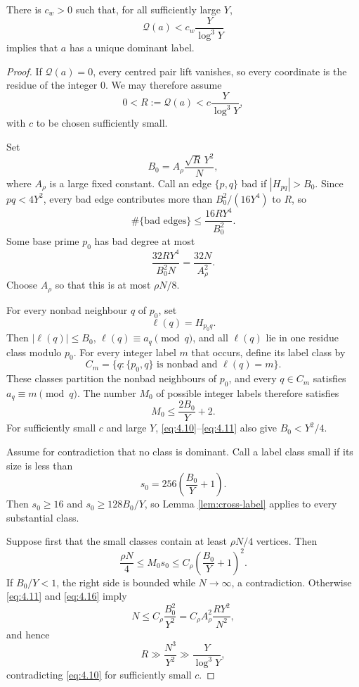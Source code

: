 \begin{proposition}\label{prop:dominant-label}
There is $c_w>0$ such that, for all sufficiently large $Y$,
\[
\mathcal Q(a)<c_w\frac{Y}{\log^3Y}
\tag{4.9}\label{eq:4.9}
\]
implies that $a$ has a unique dominant label.
\end{proposition}

\begin{proof}
If $\mathcal Q(a)=0$, every centred pair lift vanishes, so every coordinate is the residue of the integer $0$. We may therefore assume
\[
0<R:=\mathcal Q(a)<c\frac{Y}{\log^3Y},
\tag{4.10}\label{eq:4.10}
\]
with $c$ to be chosen sufficiently small.

Set
\[
B_0=A_\rho\frac{\sqrt R\,Y^2}{N},
\tag{4.11}\label{eq:4.11}
\]
where $A_\rho$ is a large fixed constant. Call an edge $\{p,q\}$ bad if $|H_{pq}|>B_0$. Since $pq<4Y^2$, every bad edge contributes more than $B_0^2/(16Y^4)$ to $R$, so
\[
\#\{\text{bad edges}\}
\le
\frac{16RY^4}{B_0^2}.
\tag{4.12}\label{eq:4.12}
\]
Some base prime $p_0$ has bad degree at most
\[
\frac{32RY^4}{B_0^2N}
=
\frac{32N}{A_\rho^2}.
\tag{4.13}\label{eq:4.13}
\]
Choose $A_\rho$ so that this is at most $\rho N/8$.

For every nonbad neighbour $q$ of $p_0$, set
\[
\ell(q)=H_{p_0q}.
\]
Then $|\ell(q)|\le B_0$, $\ell(q)\equiv a_q\pmod q$, and all $\ell(q)$ lie in one residue class modulo $p_0$. For every integer label $m$ that occurs, define its label class by
\[
C_m=\{q:\{p_0,q\}\text{ is nonbad and }\ell(q)=m\}.
\]
These classes partition the nonbad neighbours of $p_0$, and every $q\in C_m$ satisfies $a_q\equiv m\pmod q$. The number $M_0$ of possible integer labels therefore satisfies
\[
M_0\le\frac{2B_0}{Y}+2.
\tag{4.14}\label{eq:4.14}
\]
For sufficiently small $c$ and large $Y$, \eqref{eq:4.10}--\eqref{eq:4.11} also give $B_0<Y^2/4$.

Assume for contradiction that no class is dominant. Call a label class small if its size is less than
\[
s_0=256\left(\frac{B_0}{Y}+1\right).
\tag{4.15}\label{eq:4.15}
\]
Then $s_0\ge16$ and $s_0\ge128B_0/Y$, so Lemma \ref{lem:cross-label} applies to every substantial class.

Suppose first that the small classes contain at least $\rho N/4$ vertices. Then
\[
\frac{\rho N}{4}
\le M_0s_0
\le C_\rho\left(\frac{B_0}{Y}+1\right)^2.
\tag{4.16}\label{eq:4.16}
\]
If $B_0/Y<1$, the right side is bounded while $N\to\infty$, a contradiction. Otherwise \eqref{eq:4.11} and \eqref{eq:4.16} imply
\[
N\le C_\rho\frac{B_0^2}{Y^2}
=C_\rho A_\rho^2\frac{RY^2}{N^2},
\]
and hence
\[
R\gg\frac{N^3}{Y^2}\gg\frac{Y}{\log^3Y},
\]
contradicting \eqref{eq:4.10} for sufficiently small $c$.


\end{proof}
